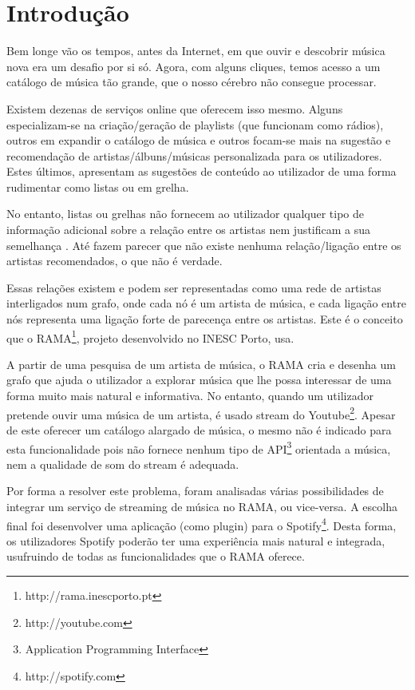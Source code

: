 
\chapter{Introdução} \label{chap:intro}

Bem longe vão os tempos, antes da Internet, em que ouvir e descobrir música nova era um desafio por si só. Agora, com alguns cliques, temos acesso a um catálogo de música tão grande, que o nosso cérebro não consegue processar.

Existem dezenas de serviços online que oferecem isso mesmo.
Alguns especializam-se na criação/geração de playlists (que funcionam como rádios), outros em expandir o catálogo de música e outros focam-se mais na sugestão e recomendação de artistas/álbuns/músicas personalizada para os utilizadores.
Estes últimos, apresentam as sugestões de conteúdo ao utilizador de uma forma rudimentar como listas ou em grelha.

No entanto, listas ou grelhas não fornecem ao utilizador qualquer tipo de informação adicional sobre a relação entre os artistas nem justificam a sua semelhança \cite{Lamere2008}.
Até fazem parecer que não existe nenhuma relação/ligação entre os artistas recomendados, o que não é verdade.

Essas relações existem e podem ser representadas como uma rede de artistas interligados num grafo, onde cada nó é um artista de música, e cada ligação entre nós representa uma ligação forte de parecença entre os artistas.
Este é o conceito que o RAMA\footnote{http://rama.inescporto.pt}, projeto desenvolvido no INESC Porto, usa.

A partir de uma pesquisa de um artista de música, o RAMA cria e desenha um grafo que ajuda o utilizador a explorar música que lhe possa interessar de uma forma muito mais natural e informativa.
No entanto, quando um utilizador pretende ouvir uma música de um artista, é usado stream do Youtube\footnote{http://youtube.com}. 
Apesar de este oferecer um catálogo alargado de música, o mesmo não é indicado para esta funcionalidade pois não fornece nenhum tipo de API\footnote{Application Programming Interface} orientada a música, nem a qualidade de som do stream é adequada.

Por forma a resolver este problema, foram analisadas várias possibilidades de integrar um serviço de streaming de música no RAMA, ou vice-versa.
A escolha final foi desenvolver uma aplicação (como plugin) para o Spotify\footnote{http://spotify.com}.
Desta forma, os utilizadores Spotify poderão ter uma experiência mais natural e integrada, usufruindo de todas as funcionalidades que o RAMA oferece.



